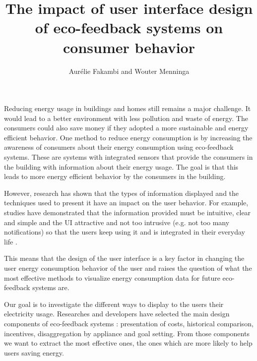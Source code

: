 \documentclass[journal]{vgtc}                %
\title{The impact of user interface design of eco-feedback systems on consumer behavior}
\author{Aur\'{e}lie Fakambi and Wouter Menninga}
\begin{document}


\maketitle


Reducing energy usage in buildings and homes still remains a major challenge. It would lead to a better environment with less pollution and waste of energy. The consumers could also save money if they adopted a more sustainable and energy efficient behavior. %
One method to reduce energy consumption is by increasing the awareness of consumers about their energy consumption using eco-feedback systems. These are systems with integrated sensors that provide the consumers in the building with information about their energy usage. The goal is that this leads to more energy efficient behavior by the consumers in the building. 

However, research has shown that the types of information displayed and the techniques used to present it have an impact on the user behavior.
For example, studies have demonstrated that the information provided must be intuitive, clear and simple and the UI attractive and not too intrusive (e.g. not too many notifications) so that the users keep using it and is integrated in their everyday life \cite{spagnolli2011eco}.

This means that the design of the user interface is a key factor in changing the user energy consumption behavior of the user and raises the question of what the most effective methods to visualize energy consumption data for future eco-feedback systems are. 

Our goal is to investigate the different ways to display to the users their electricity usage.
Researches and developers have selected %
the main design components of eco-feedback systems %
: presentation of costs, historical comparison, incentives, disaggregation by appliance and goal setting. From those components we want to extract the most effective ones, the ones which are more likely to help users saving energy. 
\end{document}

